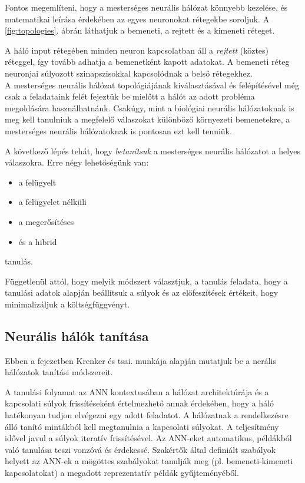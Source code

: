 \documentclass[12pt,a4]{article}
\begin{document}
	Fontos megemlíteni, hogy a mesterséges neurális hálózat könnyebb kezelése, és matematikai leírása érdekében az egyes neuronokat rétegekbe soroljuk. A \ref{fig:topologies}. ábrán láthatjuk a bemeneti, a rejtett és a kimeneti réteget.
	
	A háló input rétegében minden neuron kapcsolatban áll a \textit{rejtett} (köztes) réteggel, így tovább adhatja a bemenetként kapott adatokat. A bemeneti réteg neuronjai súlyozott szinapszisokkal kapcsolódnak a belső rétegekhez.\\
	
	A mesterséges neurális hálózat 
	topológiájának kiválasztásával és 
	felépítésével még csak a feladataink 
	felét fejeztük be mielőtt a hálót az 
	adott probléma megoldására használhatnánk.
	Csakúgy, mint a biológiai neurális hálózatoknak
	is meg kell tanulniuk a megfelelő válaszokat különböző környezeti bemenetekre, a mesterséges neurális hálózatoknak is pontosan ezt kell tenniük.
	
	A következő lépés tehát, hogy \textit{betanítsuk} a mesterséges neurális hálózatot a helyes válaszokra.
	Erre négy lehetőségünk van:
	\begin{itemize}
		\item a felügyelt
		\item a felügyelet nélküli
		\item a megerősítéses
		\item és a hibrid
	\end{itemize}
	tanulás.
	
	 Függetlenül attól, hogy melyik módszert választjuk, a tanulás feladata, hogy a tanulási adatok alapján beállítsuk a súlyok és az előfeszítések értékeit, hogy minimalizáljuk a 
	költségfüggvényt.
	
	\subsection{Neurális hálók tanítása}
    Ebben a fejezetben \cite{krenker}Krenker és tsai. munkája alapján mutatjuk be a nerális hálózatok tanítási módszereit.
 
	A tanulási folyamat az \cite{ann2}ANN kontextusában a
	hálózat architektúrája és a kapcsolati súlyok frissítéseként értelmezhető annak érdekében, hogy a háló hatékonyan tudjon elvégezni egy adott feladatot.
	A hálózatnak a rendelkezésre álló tanító mintákból kell megtanulnia a kapcsolati súlyokat. A teljesítmény idővel javul a súlyok iteratív frissítésével.
	Az ANN-eket automatikus, példákból való tanulása teszi 
	vonzóvá és érdekessé. Szakértők által definiált szabályok helyett az ANN-ek a mögöttes szabályokat tanulják meg (pl. bemeneti-kimeneti kapcsolatokat) a megadott reprezentatív példák gyűjteményéből.
	
\end{document}
